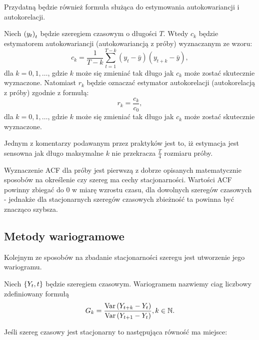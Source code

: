 \documentclass[10pt,a4paper]{book}
\begin{document}
Przydatną będzie również formuła służąca do estymowania autokowariancji i autokorelacji.

\begin{definition}
Niech $\left( {y_t} \right)_{t}^{}$ będzie szeregiem czasowym o długości $T$. Wtedy $c_k$ będzie estymatorem autokowariancji (autokowariancją z próby) wyznaczanym ze wzoru:
$$
c_k = \frac{1}{T-k}	 \sum_{t=1}^{T-k} (y_t - \bar{y}) (y_{t+k} - \bar{y}),
$$
dla $k = 0,1, \ldots$, gdzie $k$ może się zmieniać tak długo jak $c_k$ może zostać skutecznie wyznaczone.
Natomiast $r_k$ będzie oznaczać estymator autokorelacji (autokorelacją z próby) zgodnie z formułą:
$$
r_k = \frac{c_k}{c_0},
$$
dla $k = 0,1, \ldots$, gdzie $k$ może się zmieniać tak długo jak $c_k$ może zostać skutecznie wyznaczone.
\end{definition}

Jednym z komentarzy podawanym przez praktyków jest to, iż estymacja jest sensowna jak długo maksymalne $k$ nie przekracza $\frac{T}{4}$ rozmiaru próby.

\begin{remark}
Wyznaczenie ACF dla próby jest pierwszą z dobrze opisanych matematycznie sposobów na określenie czy szereg ma cechy stacjonarności. Wartości ACF powinny zbiegać do $0$ w miarę wzrostu czasu, dla dowolnych szeregów czasowych - jednakże dla stacjonarnych szeregów czasowych zbieżność ta powinna być znacząco szybsza.
\end{remark}

\subsection{Metody wariogramowe}
Kolejnym ze sposobów na zbadanie stacjonarności szeregu jest utworzenie jego wariogramu. 

\begin{definition}[Wariogram]
Niech $\left\lbrace {{Y_t}, {t}} \right\rbrace$ będzie szeregiem czasowym. Wariogramem nazwiemy ciag liczbowy zdefiniowany formułą
$$
G_k = \frac{\operatorname{Var} \left( {Y_{t+k} - Y_{t}} \right)}{ \operatorname{Var} \left( {Y_{t+1} - Y_t } \right)}, k \in \mathbb{N}.
$$
\end{definition}

Jeśli szereg czasowy jest stacjonarny to następująca równość ma miejsce:
\end{document}
